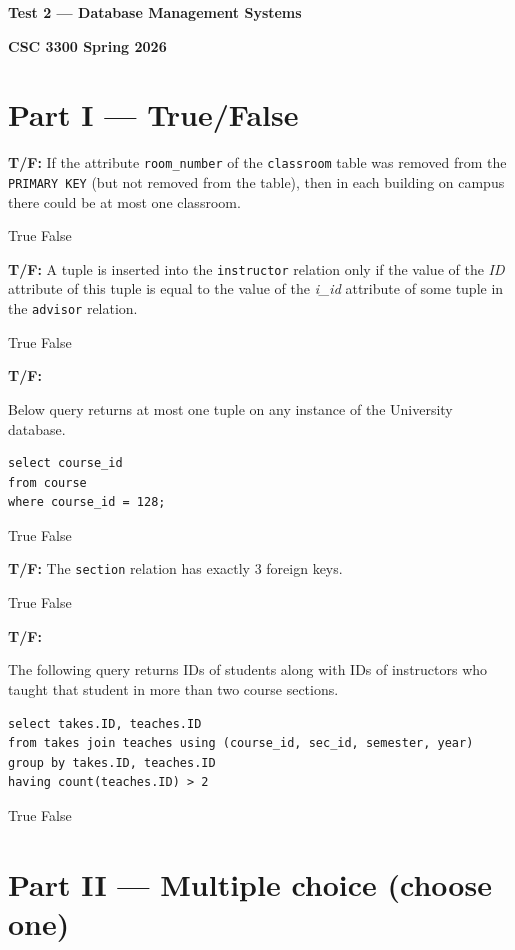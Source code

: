 \documentclass[12pt]{exam}
\makeatletter
\newcommand{\tfq}[3]{%
  \question[#1]\textbf{T/F:} #2%
  \ifprintanswers
    \par\begin{oneparchoices}
      #3
    \end{oneparchoices}
  \fi
}
\newcommand{\TFQ@choices}{} %
\newenvironment{tfqverb}[2]{%
  \def\TFQ@choices{#2}%
  \question[#1]\textbf{T/F:}%
}{%
  \ifprintanswers
    \par\begin{oneparchoices}\TFQ@choices\end{oneparchoices}
  \fi
}
\makeatother
\begin{document}
\begin{center}
\textbf{\Large Test 2 — Database Management Systems}

\textbf{CSC 3300 \quad Spring 2026}
\end{center}

\begin{questions}
\section*{Part I — True/False}
\tfq{3}{If the attribute \texttt{room\_number} of the \texttt{classroom} table was removed from the \texttt{PRIMARY KEY} (but not removed from the table), then in each building on campus there could be at most one classroom.}{\CorrectChoice True \choice False}
\tfq{3}{A tuple is inserted into the \texttt{instructor} relation only if the value of the \textit{ID} attribute of this tuple is equal to the value of the \textit{i\_id} attribute of some tuple in the \texttt{advisor} relation.}{\choice True \CorrectChoice False}
\begin{tfqverb}{3}{\choice True \CorrectChoice False}
Below query returns at most one tuple on any instance of the University database.

\begin{verbatim}
select course_id
from course
where course_id = 128;
\end{verbatim}
\end{tfqverb}
\tfq{2}{The \texttt{section} relation has exactly 3 foreign keys.}{\choice True \CorrectChoice False}

\begin{tfqverb}{3}{\CorrectChoice True \choice False}
The following query returns IDs of students along with IDs of instructors who taught that student in more than two course sections.

\begin{verbatim}
select takes.ID, teaches.ID 
from takes join teaches using (course_id, sec_id, semester, year)
group by takes.ID, teaches.ID 
having count(teaches.ID) > 2
\end{verbatim}
\end{tfqverb}

\section*{Part II — Multiple choice (choose one)}


\end{questions}
\end{document}
